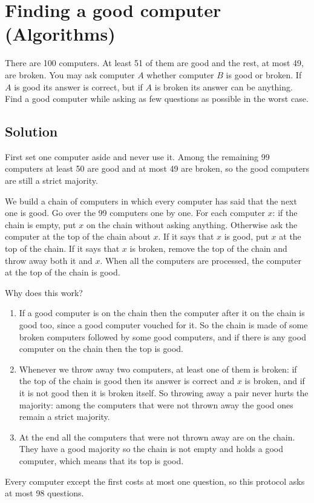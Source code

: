 \section {Finding a good computer (Algorithms)}

There are 100 computers. At least 51 of them are good and the rest, at most 49, are broken.
You may ask computer $A$ whether computer $B$ is good or broken.
If $A$ is good its answer is correct, but if $A$ is broken its answer can be anything.
Find a good computer while asking as few questions as possible in the worst case.

\subsection{Solution}

First set one computer aside and never use it. Among the remaining 99 computers at least 50 are good and at most 49 are broken,
so the good computers are still a strict majority.

We build a chain of computers in which every computer has said that the next one is good.
Go over the 99 computers one by one. For each computer $x$:
if the chain is empty, put $x$ on the chain without asking anything.
Otherwise ask the computer at the top of the chain about $x$.
If it says that $x$ is good, put $x$ at the top of the chain.
If it says that $x$ is broken, remove the top of the chain and throw away both it and $x$.
When all the computers are processed, the computer at the top of the chain is good.

Why does this work?
\begin{enumerate}
\item If a good computer is on the chain then the computer after it on the chain is good too, since a good computer vouched for it.
So the chain is made of some broken computers followed by some good computers, and if there is any good computer on the chain then the top is good.
\item Whenever we throw away two computers, at least one of them is broken: if the top of the chain is good then its answer is correct and $x$ is broken,
and if it is not good then it is broken itself.
So throwing away a pair never hurts the majority: among the computers that were not thrown away the good ones remain a strict majority.
\item At the end all the computers that were not thrown away are on the chain. They have a good majority so the chain is not empty and holds a good computer,
which means that its top is good.
\end{enumerate}

Every computer except the first costs at most one question, so this protocol asks at most 98 questions.
